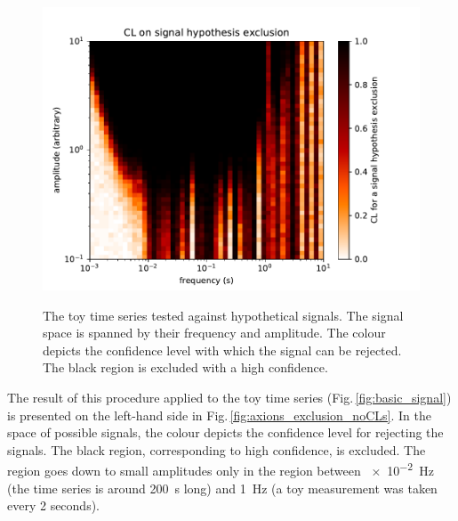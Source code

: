 \begin{figure}
  \myfloatalign
  \subfloat
  [The test without the use of the CLs method.]
  {\label{fig:axions_exclusion_noCLs}
  \includegraphics[width=.45\linewidth]{gfx/axions/basic_exclusion_noCls.pdf}}
  \quad
  \caption{The toy time series tested against hypothetical signals. The signal space is spanned by their frequency and amplitude. The colour depicts the confidence level with which the signal can be rejected. The black region is excluded with a high confidence.}
  \label{fig:axions_exclusions}
\end{figure}

The result of this procedure applied to the toy time series (Fig.\,\ref{fig:basic_signal}) is presented on the left-hand side in Fig.\,\ref{fig:axions_exclusion_noCLs}. In the space of possible signals, the colour depicts the confidence level for rejecting the signals. The black region, corresponding to high confidence, is excluded. The region goes down to small amplitudes only in the region between \SI{e-2}{\hertz} (the time series is around \SI{200}{\second} long) and \SI{1}{\hertz} (a toy measurement was taken every 2 seconds).

